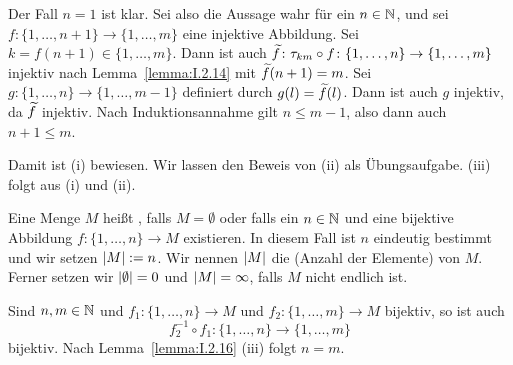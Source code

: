 \begin{beweis}
	Der Fall $n=1$ ist klar.
	Sei also die Aussage wahr für ein $n \in \mathbb{N}$, und sei $f\colon \{1, \dots, n+1\} \rightarrow \{1,\dots,m\}$ eine injektive Abbildung.
	Sei $k = f(n+1) \in \{1,\dots,m\}$.
	Dann ist auch $\widetilde{f}\colon \tau_{km} \circ f \colon \{1,\dots,n\} \rightarrow \{1,\dots,m\}$ injektiv nach Lemma~\ref{lemma:I.2.14} mit $\widetilde{f}(n+1)=m$.
	Sei $g \colon \{1,\dots,n\} \rightarrow \{1,\dots,m-1\}$ definiert durch $g(l) = \widetilde{f}(l)$.
	Dann ist auch $g$ injektiv, da $\widetilde{f}$ injektiv.
	Nach Induktionsannahme gilt $n \leq m-1$, also dann auch $n+1 \leq m$.
	
	Damit ist (i) bewiesen.
	Wir lassen den Beweis von (ii) als Übungsaufgabe.
	(iii) folgt aus (i) und (ii).
\end{beweis}

\begin{definition}
	\label{def:I.2.17}
	Eine Menge $M$ heißt , falls $M = \emptyset$ oder falls ein $n \in \mathbb{N}$ und eine bijektive Abbildung $f \colon \{1,\dots,n\} \rightarrow M$ existieren.
	In diesem Fall ist $n$ eindeutig bestimmt und wir setzen $\left\lvert M\right\rvert := n$.
	Wir nennen $\left\lvert M\right\rvert$ die  (Anzahl der Elemente) von $M$.
	Ferner setzen wir $\left\lvert\emptyset\right\rvert = 0$ und $\left\lvert M\right\rvert = \infty$, falls $M$ nicht endlich ist.
\end{definition}

\begin{beweis}
	Sind $n,m \in \mathbb{N}$ und $f_1\colon \{1,\dots,n\} \rightarrow M$ und $f_2 \colon \{1,\dots,m\} \rightarrow M$ bijektiv, so ist auch
	\[
		f_2^{-1} \circ f_1 \colon \{1,\dots,n\} \rightarrow \{1,\dots,m\}
	\]
	bijektiv.
	Nach Lemma~\ref{lemma:I.2.16} (iii) folgt $n = m$.
\end{beweis} 
\cleardoubleoddemptypage